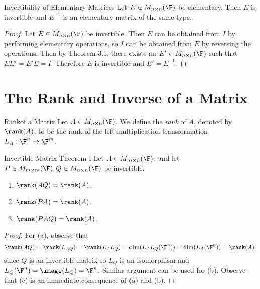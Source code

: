 \documentclass[linearalgebra]{subfiles}
\begin{document}
    \begin{prop}{Invertibility of Elementary Matrices}
        Let $E\in M_{n\times n}(\F)$ be elementary. Then $E$ is invertible and $E^{-1}$ is an elementary matrix of the same type.
    \end{prop}

    \begin{proof}
        Let $E\in M_{n\times n}(\F)$ be invertible. Then $E$ can be obtained from $I$ by performing elementary operations, so $I$ can be obtained from $E$ by reversing the operations. Then by Theorem 3.1, there exists an $E'\in M_{n\times n}(\F)$ such that $EE'=E'E=I$. Therefore $E$ is invertible and $E' = E^{-1}$.
    \end{proof}

    \section{The Rank and Inverse of a Matrix}
    
    \begin{definition}{Rank}{of a Matrix}
        Let $A\in M_{n\times n}(\F)$. We define the \emph{rank} of $A$, denoted by $\rank(A)$, to be the rank of the left multiplication transformation $L_A: \F^n\to \F^m$.
    \end{definition}

    \begin{theorem}{Invertible Matrix Theorem I}
        Let $A\in M_{m\times n}(\F)$, and let $P\in M_{m\times m}(\F), Q\in M_{n\times n}(\F)$ be invertible. 
        \begin{enumerate}
            \item $\rank(AQ) = \rank(A)$. 
            \item $\rank(PA) = \rank(A)$. 
            \item $\rank(PAQ) = \rank(A)$.
        \end{enumerate}
    \end{theorem}
    
    \begin{proof}
        For (a), observe that 
        \begin{equation*}
            \rank(AQ) = \rank(L_{AQ}) = \rank(L_AL_Q) = \dim (L_AL_Q(\F^n)) = \dim(L_A(\F^n)) = \rank(A),
        \end{equation*}
        since $Q$ is an invertible matrix so $L_Q$ is an isomorphism and $L_Q(\F^n) = \image(L_Q) = \F^n$. Similar argument can be used for (b). Observe that (c) is an immediate consequence of (a) and (b).
    \end{proof}
\end{document}
